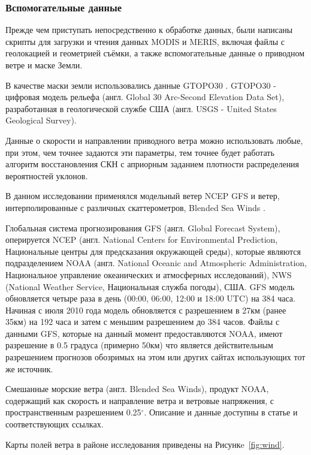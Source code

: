 \subsubsection{Вспомогательные данные}

Прежде чем приступать непосредственно к обработке данных, были написаны скрипты для загрузки и чтения данных MODIS и MERIS, включая файлы с геолокацией и геометрией съёмки, а также вспомогательные данные о приводном ветре и маске Земли.

В качестве маски земли использовались данные GTOPO30 \citep{USGS1996gtopo30}. GTOPO30 - цифровая модель рельефа (англ. Global 30 Arc-Second Elevation Data Set), разработанная в геологической службе США (англ. USGS - United States Geological Survey).

Данные о скорости и направлении приводного ветра можно использовать любые, при этом, чем точнее задаются эти параметры, тем точнее будет работать алгоритм восстановления СКН с априорным заданием плотности распределения вероятностей уклонов.

В данном исследовании применялся модельный ветер NCEP GFS \citep{ncep} и ветер, интерполированные с различных скаттерометров, Blended Sea Winds \citep{Zhang2006}.

Глобальная система прогнозирования GFS (англ. Global Forecast System), оперируется NCEP (англ. National Centers for Environmental Prediction, Национальные центры для предсказания окружающей среды), которые являются подразделением NOAA (англ. National Oceanic and Atmospheric Administration, Национальное управление океанических и атмосферных исследований), NWS (National Weather Service, Национальная служба погоды), США. GFS модель обновляется четыре раза в день (00:00, 06:00, 12:00 и 18:00 UTC) на 384 часа. Начиная с июля 2010 года модель обновляется с разрешением в 27км (ранее 35км) на 192 часа и затем с меньшим разрешением до 384 часов. Файлы с данными GFS, которые на данный момент предоставляются NOAA, имеют разрешение в 0.5 градуса (примерно 50км) что является действительным разрешением прогнозов обозримых на этом или других сайтах использующих тот же источник.

Смешанные морские ветра (англ. Blended Sea Winds), продукт NOAA, содержащий как скорость и направление ветра и ветровые напряжения, с пространственным разрешением 0.25${}^\circ$. Описание и данные доступны в статье \citep{Zhang2006} и соответствующих ссылках.

Карты полей ветра в районе исследования приведены на Рисункe~\ref{fig:wind}.




